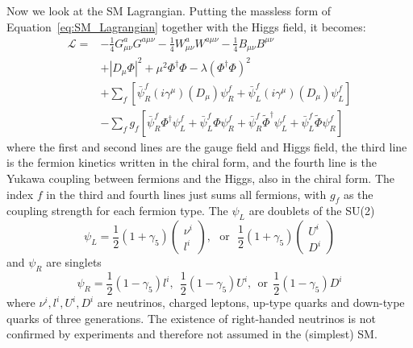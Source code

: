 Now we look at the SM Lagrangian.
Putting the massless form of Equation~\ref{eq:SM_Lagrangian} together with the Higgs field, it becomes:
\begin{equation}\label{eq:SM_Lagrangian_Higgs}
  \begin{split}
    \mathcal{L} = &  - \frac{1}{4} G^{a}_{\mu\nu}G^{a\mu\nu}
                     - \frac{1}{4} W^{a}_{\mu\nu}W^{a\mu\nu}
                     - \frac{1}{4} B_{\mu\nu}B^{\mu\nu} \\
                  & + |D_{\mu}\Phi|^2 + \mu^{2} \Phi^{\dagger}\Phi - \lambda (\Phi^{\dagger}\Phi)^{2} \\
                  & + \sum_{f} [\bar{\psi}^{f}_{R} (i\gamma^{\mu})(D_{\mu})\psi^{f}_{R} + \bar{\psi}^{f}_{L} (i\gamma^{\mu})(D_{\mu})\psi^{f}_{L}] \\
                  & - \sum_{f} g_{f} [\bar{\psi}^{f}_{R}\Phi^{\dagger}\psi^{f}_{L} + \bar{\psi}^{f}_{L}\Phi\psi^{f}_{R} + \bar{\psi}^{f}_{R}\tilde{\Phi}^{\dagger}\psi^{f}_{L} + \bar{\psi}^{f}_{L}\tilde{\Phi}\psi^{f}_{R}]
  \end{split} 
\end{equation}
where the first and second lines are the gauge field and Higgs field,
the third line is the fermion kinetics written in the chiral form,
and the fourth line is the Yukawa coupling between fermions and the Higgs, also in the chiral form.
The index $f$ in the third and fourth lines just sums all fermions, 
with $g_{f}$ as the coupling strength for each fermion type.
The $\psi_{L}$ are doublets of the SU(2)
\begin{equation}\label{eq:SU2_doublet}
    \psi_{L} = \frac{1}{2} (1+\gamma_{5}) \begin{pmatrix} \nu^{i} \\ l^{i} \end{pmatrix},
    ~~~\text{or}~~~
    \frac{1}{2} (1+\gamma_5) \begin{pmatrix} U^{i} \\ D^{i} \end{pmatrix}
\end{equation}
and $\psi_{R}$ are singlets
\begin{equation}\label{eq:SU2_singlet}
    \psi_{R} =  \frac{1}{2} (1-\gamma_{5}) l^{i}, ~~\frac{1}{2} (1-\gamma_{5}) U^{i}, ~~\text{or}~~\frac{1}{2} (1-\gamma_{5}) D^{i}
\end{equation}
where $\nu^{i}, l^{i}, U^{i}, D^{i}$ are neutrinos, charged leptons, up-type quarks and down-type quarks of three generations.
The existence of right-handed neutrinos is not confirmed by experiments and therefore not assumed in the (simplest) SM.  
